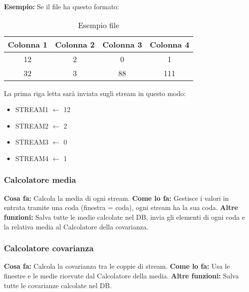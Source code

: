 \documentclass{article}
\begin{document}
\vspace{10pt}
\textbf{Esempio:}
\vspace{5pt} \newline
Se il file ha questo formato:

\vspace{10pt}

\begin{table}[H]
	\centering
	\begin{tabular}{c|c|c|c}
		Colonna 1 & Colonna 2 & Colonna 3 & Colonna 4 \\
		\hline
		12        & 2         & 0         & 1         \\
		32        & 3         & 88        & 111       \\
	\end{tabular}
	\caption{Esempio file}
	\label{tab:esempio}
\end{table}

\vspace{10pt}

La prima riga letta sarà inviata sugli stream in questo modo: 
\vspace{3pt}
\begin{itemize}
    \item STREAM1 $\gets$ 12
    \item STREAM2 $\gets$ 2
    \item STREAM3 $\gets$ 0
    \item STREAM4 $\gets$ 1
\end{itemize}

\subsubsection{Calcolatore media}
\textbf{Cosa fa:} Calcola la media di ogni stream.
\vspace{3pt}
\newline
\textbf{Come lo fa:} Gestisce i valori in entrata tramite una coda (finestra = coda), ogni stream ha la sua coda.
\vspace{3pt}
\newline
\textbf{Altre funzioni:} Salva tutte le medie calcolate nel DB, invia gli elementi di ogni coda e la relativa media al Calcolatore della covarianza.

\subsubsection{Calcolatore covarianza}
\textbf{Cosa fa:} Calcola la covarianza tra le coppie di stream.
\vspace{3pt}
\newline
\textbf{Come lo fa:} Usa le finestre e le medie ricevute dal Calcolatore della media.
\vspace{3pt}
\newline
\textbf{Altre funzioni:} Salva tutte le covarianze calcolate nel DB.
\end{document}
